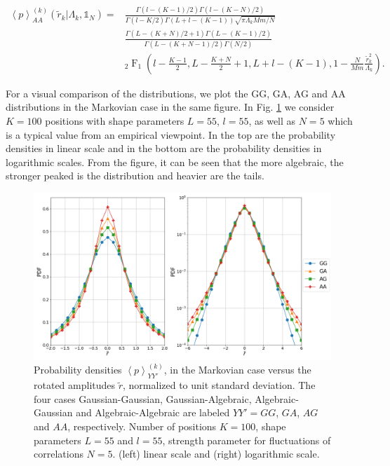 \begin{equation}
    \begin{split}
    \left\langle p \right\rangle_{AA}^{\left(k\right)}
    \left(\tilde{r}_{k} \vert \Lambda_{k}, \mathbb{1}_{N}\right) =
    &\frac{\Gamma\left(l - \left(K - 1 \right) / 2\right)
    \Gamma\left(l - \left(K - N\right) / 2\right)}
    {\Gamma\left(l - K/ 2\right) \Gamma\left(L + l - \left(K - 1\right) \right)
    \sqrt{\pi \Lambda_{k}Mm/N}} \\
    &\frac{\Gamma\left(L - \left(K + N \right) / 2 + 1\right)
    \Gamma\left(L - \left(K - 1\right) / 2\right)}
    {\Gamma\left(L - \left(K + N - 1\right) / 2\right) \Gamma\left(N / 2\right)
    } \\
    & _{2}\operatorname{F}_{1} \left(l - \frac{K - 1}{2}, L -\frac{K + N}{2}+1,
    L + l - \left(K - 1\right), 1 - \frac{N}{Mm} \frac{\tilde{r}^{2}_{k}}
    {\Lambda_{k}}\right).
    \end{split}
\end{equation}

For a visual comparison of the distributions, we plot the GG, GA, AG and AA
distributions in the Markovian case in the same figure. In Fig.
\ref{fig:distributions_comparison} we consider $K = 100$ positions with shape
parameters $L = 55$, $l = 55$, as well as $N = 5$ which is a typical value from
an empirical viewpoint. In the top are the probability densities in linear
scale and in the bottom are the probability densities in logarithmic scales.
From the figure, it can be seen that the more algebraic, the stronger peaked is
the distribution and heavier are the tails.

\begin{figure}[htbp]
    \centering
    \includegraphics[width=0.9\columnwidth]
    {figures/07_distributions_comparison.png}
    \caption{Probability densities
             $\left\langle p \right\rangle_{YY'}^{\left(k\right)}$, in the
             Markovian case versus the rotated amplitudes $\tilde{r}$,
             normalized to unit standard deviation. The four cases
             Gaussian-Gaussian, Gaussian-Algebraic, Algebraic-Gaussian and
             Algebraic-Algebraic are labeled $YY' = GG$, $GA$, $AG$ and $AA$,
             respectively. Number of positions $K = 100$, shape parameters
             $L = 55$ and $l = 55$, strength parameter for fluctuations of
             correlations $N = 5$. (left) linear scale and (right) logarithmic
             scale.}
    \label{fig:distributions_comparison}
\end{figure}


